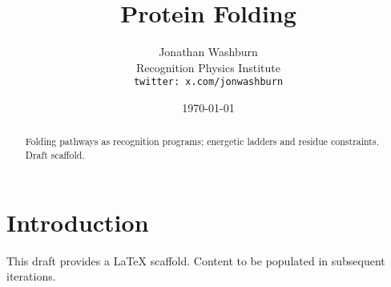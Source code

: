 \documentclass[11pt,letterpaper]{article}
\title{Protein Folding}
\author{Jonathan Washburn\\Recognition Physics Institute\\\texttt{twitter: x.com/jonwashburn}}
\date{\today}
\begin{document}
\maketitle
\begin{abstract}
Folding pathways as recognition programs; energetic ladders and residue constraints. Draft scaffold.
\end{abstract}
\section{Introduction}
This draft provides a LaTeX scaffold. Content to be populated in subsequent iterations.
\end{document}
